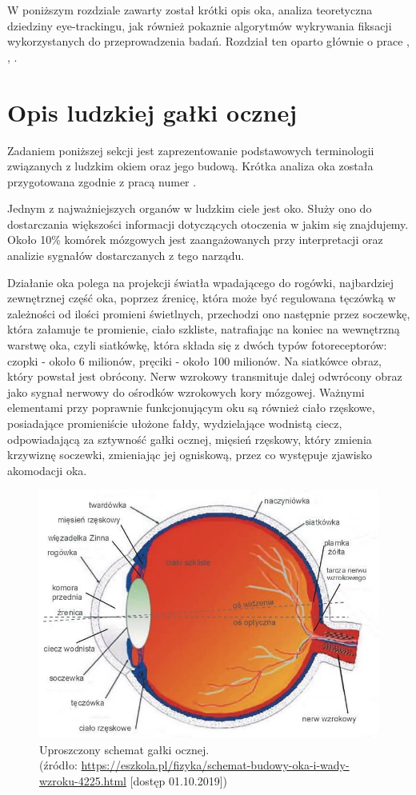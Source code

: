 \label{chapter:ch2}
W poniższym rozdziale zawarty został krótki opis oka, analiza teoretyczna dziedziny eye-trackingu, jak również pokaznie algorytmów wykrywania fiksacji wykorzystanych do przeprowadzenia badań. Rozdział ten oparto głównie o prace \cite{Main}, \cite{EvaluationMethodology}, \cite{MachineLearning}.
\section{Opis ludzkiej gałki ocznej}
Zadaniem poniższej sekcji jest zaprezentowanie podstawowych terminologii związanych z ludzkim okiem oraz jego budową. Krótka analiza oka została przygotowana zgodnie z pracą numer \cite{EvaluationMethodology}.\par
Jednym z najważniejszych organów w ludzkim ciele jest oko. Służy ono do dostarczania większości informacji dotyczących otoczenia w jakim się znajdujemy. Około 10\% komórek mózgowych jest zaangażowanych przy interpretacji oraz analizie sygnałów dostarczanych z tego narządu.\par
Działanie oka polega na projekcji światła wpadającego do rogówki, najbardziej zewnętrznej część oka, poprzez źrenicę, która może być regulowana tęczówką w zależności od ilości promieni świetlnych, przechodzi ono następnie przez soczewkę, która załamuje te promienie, ciało szkliste, natrafiając na koniec na wewnętrzną warstwę oka, czyli siatkówkę, która składa się z dwóch typów fotoreceptorów: czopki - około 6 milionów, pręciki - około 100 milionów. Na siatkówce obraz, który powstał jest obrócony. Nerw wzrokowy transmituje dalej odwrócony obraz jako sygnał nerwowy do ośrodków wzrokowych kory mózgowej. Ważnymi elementami przy poprawnie funkcjonującym oku są również ciało rzęskowe, posiadające promieniście ułożone fałdy, wydzielające wodnistą ciecz, odpowiadającą za sztywność gałki ocznej, mięsień rzęskowy, który zmienia krzywiznę soczewki, zmieniając jej ogniskową, przez co występuje zjawisko akomodacji oka. 
\begin{figure}[H]
    \centering
    \captionsetup{justification=centering,margin=2cm}
    \includegraphics[width=0.8\linewidth]{resources/oko_galka.jpg}
    \caption[Przekrój oka.]{Uproszczony schemat gałki ocznej.\\\hspace{\textwidth} 
    \small(źródło: \url{https://eszkola.pl/fizyka/schemat-budowy-oka-i-wady-wzroku-4225.html} [dostęp 01.10.2019])}
    \label{fig:budowaoka}
\end{figure}
